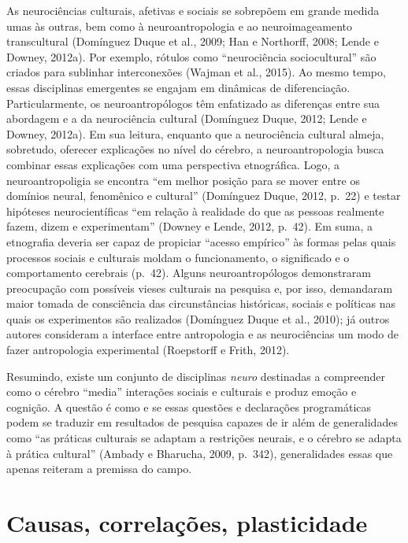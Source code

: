 As neurociências culturais, afetivas e sociais se sobrepõem em grande
medida umas às outras, bem como à neuroantropologia e ao neuroimageamento
transcultural (Domínguez Duque et al., 2009; Han e Northorff, 2008;
Lende e Downey, 2012a). Por exemplo, rótulos como ``neurociência
sociocultural'' são criados para sublinhar interconexões (Wajman et al.,
2015). Ao mesmo tempo, essas disciplinas emergentes se engajam em
dinâmicas de diferenciação. Particularmente, os neuroantropólogos têm
enfatizado as diferenças entre sua abordagem e a da neurociência
cultural (Domínguez Duque, 2012; Lende e Downey, 2012a). Em sua leitura,
enquanto que a neurociência cultural almeja, sobretudo, oferecer
explicações no nível do cérebro, a neuroantropologia busca combinar
essas explicações com uma perspectiva etnográfica. Logo, a
neuroantropoligia se encontra ``em melhor posição para se mover entre
os domínios neural, fenomênico e cultural'' (Domínguez Duque, 2012,
p.~22) e testar hipóteses neurocientíficas ``em relação à realidade do que as
pessoas realmente fazem, dizem e experimentam'' (Downey e Lende, 2012,
p.~42). Em suma, a etnografia deveria ser capaz de propiciar ``acesso
empírico'' às formas pelas quais processos sociais e culturais moldam o
funcionamento, o significado e o comportamento cerebrais (p.~42). Alguns
neuroantropólogos demonstraram preocupação com possíveis vieses
culturais na pesquisa e, por isso, demandaram maior tomada de consciência das
circunstâncias históricas, sociais e políticas nas quais os experimentos
são realizados (Domínguez Duque et al., 2010); já outros autores
consideram a interface entre antropologia e as neurociências um modo de
fazer antropologia experimental (Roepstorff e Frith, 2012).

Resumindo, existe um conjunto de disciplinas \emph{neuro} destinadas a
compreender como o cérebro ``media'' interações sociais e culturais e
produz emoção e cognição. A questão é como e se essas questões e
declarações programáticas podem se traduzir em resultados de pesquisa
capazes de ir além de generalidades como ``as práticas culturais se
adaptam a restrições neurais, e o cérebro se adapta à prática cultural''
(Ambady e Bharucha, 2009, p.~342), generalidades essas que apenas
reiteram a premissa do campo.

\section{Causas, correlações, plasticidade}

